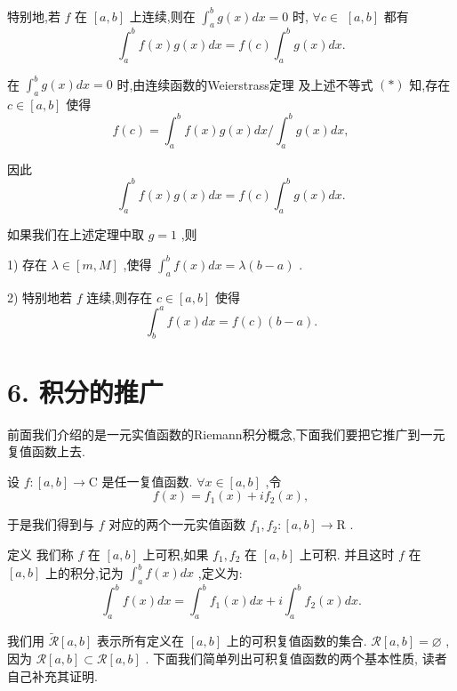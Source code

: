 特别地,若 $f$ 在 $\left\lbrack  {a,b}\right\rbrack$ 上连续,则在 ${\int }_{a}^{b}g\left( x\right) {dx} = 0$ 时, $\forall c \in$  $\left\lbrack  {a,b}\right\rbrack$ 都有
$${\int }_{a}^{b}f\left( x\right) g\left( x\right) {dx} = f\left( c\right) {\int }_{a}^{b}g\left( x\right) {dx}.$$

在 ${\int }_{a}^{b}g\left( x\right) {dx} = 0$ 时,由连续函数的Weierstrass定理 及上述不等式 $\left( *\right)$ 知,存在 $c \in  \left\lbrack  {a,b}\right\rbrack$ 使得
$$f\left( c\right)  = {\int }_{a}^{b}f\left( x\right) g\left( x\right) {dx}/{\int }_{a}^{b}g\left( x\right) {dx},$$

因此
$${\int }_{a}^{b}f\left( x\right) g\left( x\right) {dx} = f\left( c\right) {\int }_{a}^{b}g\left( x\right) {dx}.$$

如果我们在上述定理中取 $g = 1$ ,则

1) 存在 $\lambda  \in  \left\lbrack  {m,M}\right\rbrack$ ,使得 ${\int }_{a}^{b}f\left( x\right) {dx} = \lambda \left( {b - a}\right)$ .

2) 特别地若 $f$ 连续,则存在 $c \in  \left\lbrack  {a,b}\right\rbrack$ 使得
$${\int }_{b}^{a}f\left( x\right) {dx} = f\left( c\right) \left( {b - a}\right) .$$

\section*{6. 积分的推广}

前面我们介绍的是一元实值函数的Riemann积分概念,下面我们要把它推广到一元复值函数上去.

设 $f : \left\lbrack  {a,b}\right\rbrack   \rightarrow  \mathrm{C}$ 是任一复值函数. $\forall x \in  \left\lbrack  {a,b}\right\rbrack$ ,令
$$f\left( x\right)  = {f}_{1}\left( x\right)  + i{f}_{2}\left( x\right) ,$$

于是我们得到与 $f$ 对应的两个一元实值函数 ${f}_{1},{f}_{2} : \left\lbrack  {a,b}\right\rbrack   \rightarrow  \mathrm{R}$ .

定义 我们称 $f$ 在 $\left\lbrack  {a,b}\right\rbrack$ 上可积,如果 ${f}_{1},{f}_{2}$ 在 $\left\lbrack  {a,b}\right\rbrack$ 上可积. 并且这时 $f$ 在 $\left\lbrack  {a,b}\right\rbrack$ 上的积分,记为 ${\int }_{a}^{b}f\left( x\right) {dx}$ ,定义为:
$${\int }_{a}^{b}f\left( x\right) {dx} = {\int }_{a}^{b}{f}_{1}\left( x\right) {dx} + i{\int }_{a}^{b}{f}_{2}\left( x\right) {dx}.$$

我们用 $\widetilde{\mathcal{R}}\left\lbrack  {a,b}\right\rbrack$ 表示所有定义在 $\left\lbrack  {a,b}\right\rbrack$ 上的可积复值函数的集合. $\mathcal{R}\left\lbrack  {a,b}\right\rbrack   = \varnothing$ ,因为 $\mathcal{R}\left\lbrack  {a,b}\right\rbrack   \subset  \mathcal{R}\left\lbrack  {a,b}\right\rbrack$ . 下面我们简单列出可积复值函数的两个基本性质, 读者自己补充其证明.


